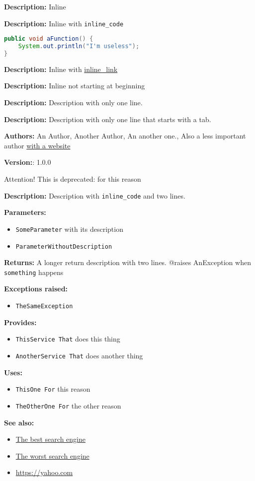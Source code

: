 \textbf{Description:}
Inline

\textbf{Description:}
Inline with \texttt{inline_code }

\begin{lstlisting}[language=Java]
public void aFunction() {
	System.out.println("I'm useless");
}
\end{lstlisting}
\textbf{Description:}
Inline with \href{inline_link}{inline_link}

\textbf{Description:}
Inline not starting at beginning

\textbf{Description:}
 Description with only one line.

\textbf{Description:}
 Description with only one line that starts with a tab.

\textbf{Authors:} An Author,  Another Author,  An another one., Also a less important author \href{https://website.net}{with a website}

\textbf{Version:}: 1.0.0 

Attention! This is deprecated: for this reason  

\textbf{Description:}
 Description with \texttt{inline_code} and two lines.  

\textbf{Parameters:}
\begin{itemize}
  \item\texttt{SomeParameter} with its description 
  \item\texttt{ParameterWithoutDescription}
\end{itemize}

\textbf{Returns:}
A longer return description with two lines. @raises		AnException when \texttt{something} happens 

\textbf{Exceptions raised:}
\begin{itemize}
  \item\texttt{TheSameException}  
\end{itemize}

\textbf{Provides:}
\begin{itemize}
  \item\texttt{ThisService		That} does this thing
  \item\texttt{AnotherService	That} does another thing
\end{itemize}

\textbf{Uses:}
\begin{itemize}
  \item\texttt{ThisOne			For} this reason
  \item\texttt{TheOtherOne		For} the other reason
\end{itemize}

\textbf{See also:}
\begin{itemize}
  \item\href{https://google.com}{The best search engine}
  \item\href{https://bing.com}{The worst search engine}
  \item\href{https://yahoo.com}{https://yahoo.com}
\end{itemize}

